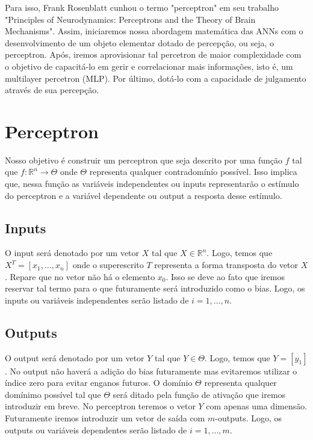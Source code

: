 \documentclass{article}
\begin{document}
Para isso, Frank Rosenblatt cunhou o termo "perceptron" em seu trabalho "Principles of Neurodynamics: Perceptrons and the Theory of Brain Mechanisms". Assim, iniciaremos nossa abordagem matemática das ANNs com o desenvolvimento de um objeto elementar dotado de percepção, ou seja, o perceptron. Após, iremos aprovisionar tal percetron de maior complexidade com o objetivo de capacitá-lo em gerir e correlacionar mais informações, isto é, um multilayer percetron (MLP). Por último, dotá-lo com a capacidade de julgamento através de sua percepção. 



\section{Perceptron}
Nosso objetivo é construir um perceptron que seja descrito por uma função \(f\) tal que \(f: \mathbb{R}^n \rightarrow \Theta\) onde \(\Theta\) representa qualquer contradomínío possível. Isso implica que, nessa função as variáveis independentes ou inputs representarão o estímulo do perceptron e a variável dependente ou output a resposta desse estímulo. 

\subsection[]{Inputs}

O input será denotado por um vetor \(X\) tal que \(X \in \mathbb{R}^n\). Logo, temos que \(X^T = [x_1, \dots, x_n]\) onde o superescrito \(T\) representa a forma transposta do vetor \(X\). Repare que no vetor não há o elemento \(x_0\). Isso se deve ao fato que iremos reservar tal termo para o que futuramente será introduzido como o bias. Logo, os inputs ou variáveis independentes serão listado de \(i=1, \dots, n\).

\subsection[]{Outputs}

O output será denotado por um vetor \(Y\) tal que \(Y \in \Theta\). Logo, temos que \(Y = [y_1]\). No output não haverá a adição do bias futuramente mas evitaremos utilizar o índice zero para evitar enganos futuros. O domínio \(\Theta\) representa qualquer domínimo possível tal que \(\Theta\) será ditado pela função de ativação que iremos introduzir em breve. No perceptron teremos o vetor \(Y\) com apenas uma dimensão. Futuramente iremos introduzir um vetor de saída com \(m\)-outputs. Logo, os outputs ou variáveis dependentes serão listado de \(i=1, \dots, m\).
\end{document}
